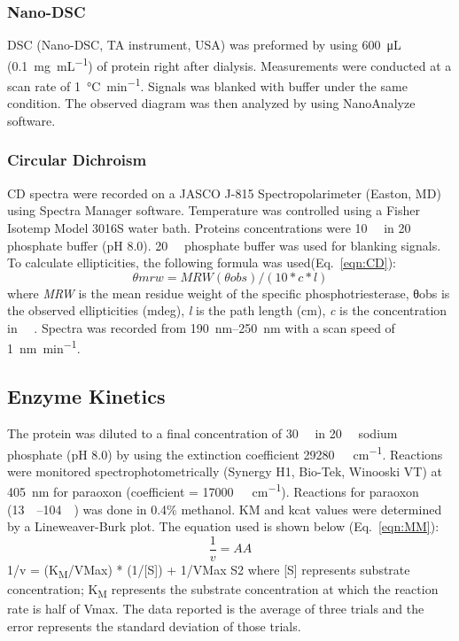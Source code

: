 \begin{refsection}
\subsubsection{Nano-DSC}
\label{sec:dsc}

DSC (Nano-DSC, TA instrument, USA) was preformed by using \SI{600}{\micro\L}
(\SI{0.1}{\mg\per\mL}) of protein right after dialysis. Measurements were
conducted at a scan rate of \SI{1}{\celsius\per\minute}. Signals was blanked with
buffer under the same condition.  The observed diagram was then analyzed by
using NanoAnalyze software.

\subsubsection{Circular Dichroism}
\label{sec:cd}
CD spectra were recorded on a JASCO J-815 Spectropolarimeter (Easton, MD) using
Spectra Manager software. Temperature was controlled using a Fisher Isotemp
Model 3016S water bath. Proteins concentrations were \SI{10}{\micro\Molar} in
\SI{20}{\milli\Molar} phosphate buffer (pH 8.0). \SI{20}{\milli\Molar}
phosphate buffer was used for blanking signals. To calculate ellipticities, the
following formula was used(Eq.~\ref{eqn:CD}): 
\begin{equation}
    θmrw = MRW(θobs) / (10 * c * l) \label{eqn:CD}
\end{equation}
where \emph{MRW} is the mean residue weight of the specific phosphotriesterase,
θobs is the observed ellipticities (mdeg), \emph{l} is the path length (cm),
\emph{c} is the concentration in \SI{}{\micro\Molar}. Spectra was recorded from
\SIrange{190}{250}{\nm} with a scan speed of \SI{1}{\nano\meter\per\minute}.

\subsection{Enzyme Kinetics}

The protein was diluted to a final concentration of \SI{30}{\nano\Molar} in
\SI{20}{\milli\Molar} sodium phosphate (pH 8.0) by using the extinction
coefficient \SI{29280}{\per\Molar\per\cm}. Reactions were monitored
spectrophotometrically (Synergy H1, Bio-Tek, Winooski VT) at \SI{405}{\nm} for
paraoxon (coefficient = \SI{17000}{\per\Molar\per\cm}).  Reactions for paraoxon
(\SIrange{13}{104}{\micro\Molar}) was done in 0.4\% methanol. KM and kcat
values were determined by a Lineweaver-Burk plot.\cite{Baker2011b} The
equation used is shown below (Eq.~\ref{eqn:MM}):
\begin{equation} 
    \frac{1}{v} = AA \label{eqn:MM}
\end{equation}
1/v = (K\textsubscript{M}/VMax) * (1/[S]) + 1/VMax S2 where [S] represents
substrate concentration; K\textsubscript{M} represents the substrate
concentration at which the reaction rate is half of Vmax. The data reported is
the average of three trials and the error represents the standard deviation of
those trials.


\end{refsection}
